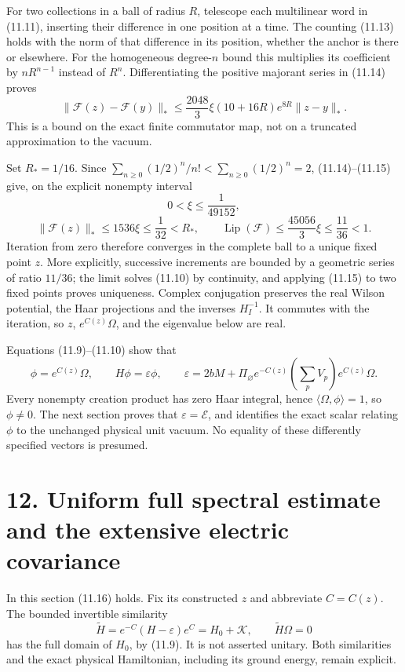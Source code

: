 \documentclass[
]{article}
\begin{document}
For two collections in a ball of radius \(R\), telescope each
multilinear word in (11.11), inserting their difference in one position
at a time. The counting (11.13) holds with the norm of that difference
in its position, whether the anchor is there or elsewhere. For the
homogeneous degree-\(n\) bound this multiplies its coefficient by
\(nR^{n-1}\) instead of \(R^n\). Differentiating the positive majorant
series in (11.14) proves \[
\|\mathcal F(z)-\mathcal F(y)\|_*
 \le\frac{2048}{3}\xi(10+16R)e^{8R}\|z-y\|_* .                \tag{11.15}
\] This is a bound on the exact finite commutator map, not on a
truncated approximation to the vacuum.

Set \(R_*=1/16\). Since
\(\sum_{n\ge0}(1/2)^n/n!<\sum_{n\ge0}(1/2)^n=2\), (11.14)--(11.15) give,
on the explicit nonempty interval \[
0<\xi\le\frac1{49152},                                      \tag{11.16}
\] \[
\|\mathcal F(z)\|_*\le1536\xi\le\frac1{32}<R_*,
\qquad
\operatorname{Lip}(\mathcal F)\le\frac{45056}{3}\xi
 \le\frac{11}{36}<1.                                       \tag{11.17}
\] Iteration from zero therefore converges in the complete ball to a
unique fixed point \(z\). More explicitly, successive increments are
bounded by a geometric series of ratio \(11/36\); the limit solves
(11.10) by continuity, and applying (11.15) to two fixed points proves
uniqueness. Complex conjugation preserves the real Wilson potential, the
Haar projections and the inverses \(H_I^{-1}\). It commutes with the
iteration, so \(z\), \(e^{C(z)}\Omega\), and the eigenvalue below are
real.

Equations (11.9)--(11.10) show that \[
\phi=e^{C(z)}\Omega,\qquad
H\phi=\varepsilon\phi,\qquad
\varepsilon=2bM+
 \Pi_\varnothing e^{-C(z)}\left(\sum_pV_p\right)e^{C(z)}\Omega.
                                                               \tag{11.18}
\] Every nonempty creation product has zero Haar integral, hence
\(\langle\Omega,\phi\rangle=1\), so \(\phi\ne0\). The next section
proves that \(\varepsilon=\mathcal E\), and identifies the exact scalar
relating \(\phi\) to the unchanged physical unit vacuum. No equality of
these differently specified vectors is presumed.

\section{12. Uniform full spectral estimate and the extensive electric
covariance}\label{uniform-full-spectral-estimate-and-the-extensive-electric-covariance}

In this section (11.16) holds. Fix its constructed \(z\) and abbreviate
\(C=C(z)\). The bounded invertible similarity \[
\widetilde H=e^{-C}(H-\varepsilon)e^C=H_0+\mathcal K,\qquad
\widetilde H\Omega=0                                       \tag{12.1}
\] has the full domain of \(H_0\), by (11.9). It is not asserted
unitary. Both similarities and the exact physical Hamiltonian, including
its ground energy, remain explicit.
\end{document}
